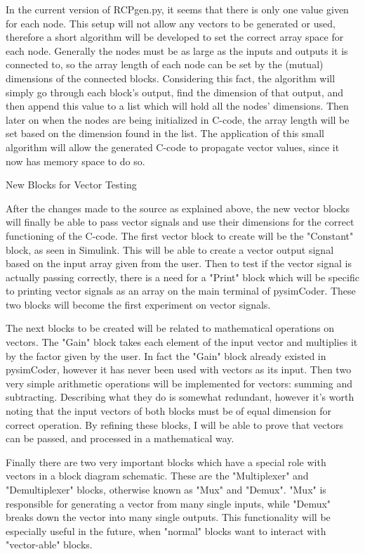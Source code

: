 \quad In the current version of RCPgen.py, it seems that there is only one value given for each node. This
setup will not allow any vectors to be generated or used, therefore a short algorithm will be developed to set
the correct array space for each node. Generally the nodes must be as large as the inputs and outputs it is
connected to, so the array length of each node can be set by the (mutual) dimensions of the connected blocks.
Considering this fact, the algorithm will simply go through each block's output, find the dimension of that
output, and then append this value to a list which will hold all the nodes' dimensions. Then later on when the
nodes are being initialized in C-code, the array length will be set based on the dimension found in the list.
The application of this small algorithm will allow the generated C-code to propagate vector values, since it
now has memory space to do so. 

\secc New Blocks for Vector Testing

\quad After the changes made to the source as explained above, the new vector blocks will finally be able to
pass vector signals and use their dimensions for the correct functioning of the C-code. The first vector block
to create will be the "Constant" block, as seen in Simulink. This will be able to create a vector output signal
based on the input array given from the user. Then to test if the vector signal is actually passing correctly,
there is a need for a "Print" block which will be specific to printing vector signals as an array on the main
terminal of pysimCoder. These two blocks will become the first experiment on vector signals.

\quad The next blocks to be created will be related to mathematical operations on vectors. The "Gain" block
takes each element of the input vector and multiplies it by the factor given by the user. In fact the "Gain"
block already existed in pysimCoder, however it has never been used with vectors as its input. Then two very
simple arithmetic operations will be implemented for vectors: summing and subtracting. Describing what they do
is somewhat redundant, however it's worth noting that the input vectors of both blocks must be of equal
dimension for correct operation. By refining these blocks, I will be able to prove that vectors can be passed,
and processed in a mathematical way.

\quad Finally there are two very important blocks which have a special role with vectors in a block diagram
schematic. These are the "Multiplexer" and "Demultiplexer" blocks, otherwise known as "Mux" and "Demux". "Mux"
is responsible for generating a vector from many single inputs, while "Demux" breaks down the vector into many
single outputs. This functionality will be especially useful in the future, when "normal" blocks want to
interact with "vector-able" blocks.

